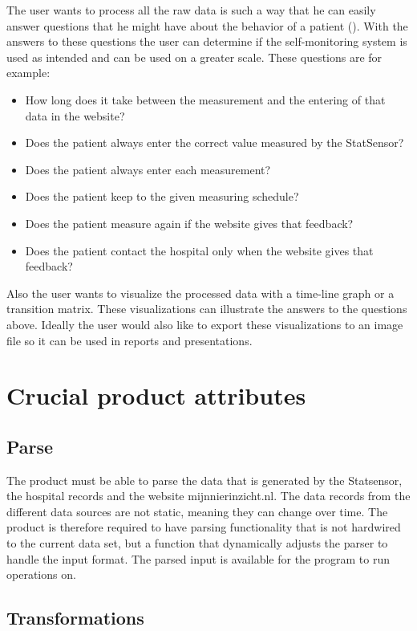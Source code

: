 \documentclass[11pt,twoside,a4paper]{article}
\begin{document}
The user wants to process all the raw data is such a way that he can easily answer questions that he might have about the behavior of a patient (\cite{INTERVIEW}). With the answers to these questions the user can determine if the self-monitoring system is used as intended and can be used on a greater scale. These questions are for example:
\begin{itemize}
\item How long does it take between the measurement and the entering of that data in the website?
\item Does the patient always enter the correct value measured by the StatSensor?
\item Does the patient always enter each measurement?
\item Does the patient keep to the given measuring schedule?
\item Does the patient measure again if the website gives that feedback?
\item Does the patient contact the hospital only when the website gives that feedback?
\end{itemize}



Also the user wants to visualize the processed data with a time-line graph or a transition matrix. These visualizations can illustrate the answers to the questions above. Ideally the user would also like to export these visualizations to an image file so it can be used in reports and presentations.

\section{Crucial product attributes}
\subsection{Parse}
The product must be able to parse the data that is generated by the Statsensor, the hospital records and the website mijnnierinzicht.nl. The data records from the different data sources are not static, meaning they can change over time. The product is therefore required to have parsing functionality that is not hardwired to the current data set, but a function that dynamically adjusts the parser to handle the input format. The parsed input is available for the program to run operations on.

\subsection{Transformations}
\end{document}
